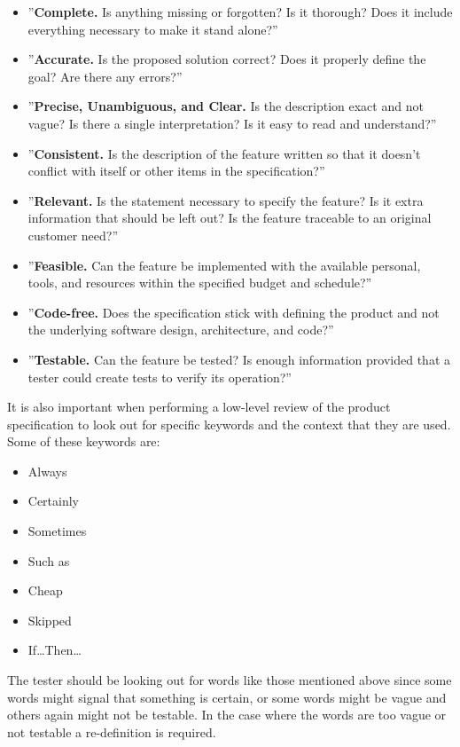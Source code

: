 \begin{itemize}
	\item ''\textbf{Complete.} Is anything missing or forgotten? Is it thorough? Does it include everything necessary to make it stand alone?''
	\item ''\textbf{Accurate.} Is the proposed solution correct? Does it properly define the goal? Are there any errors?''
	\item ''\textbf{Precise, Unambiguous, and Clear.} Is the description exact and not vague? Is there a single interpretation? Is it easy to read and understand?''
	\item ''\textbf{Consistent.} Is the description of the feature written so that it doesn't conflict with itself or other items in the specification?''
	\item ''\textbf{Relevant.} Is the statement necessary to specify the feature? Is it extra information that should be left out? Is the feature traceable to an original customer need?''
	\item ''\textbf{Feasible.} Can the feature be implemented with the available personal, tools, and resources within the specified budget and schedule?''
	\item ''\textbf{Code-free.} Does the specification stick with defining the product and not the underlying software design, architecture, and code?''
	\item ''\textbf{Testable.} Can the feature be tested? Is enough information provided that a tester could create tests to verify its operation?''
\end{itemize}

It is also important when performing a low-level review of the product specification to look out for specific keywords and the context that they are used.
Some of these keywords are:

\begin{multicols}{2}
\begin{itemize}
	\item Always
	\item Certainly
	\item Sometimes
	\item Such as
	\item Cheap
	\item Skipped
	\item If\ldots Then\ldots
\end{itemize}
\end{multicols}

The tester should be looking out for words like those mentioned above since some words might signal that something is certain, or some words might be vague and others again might not be testable.
In the case where the words are too vague or not testable a re-definition is required. \cite{SoftwareTesting}

